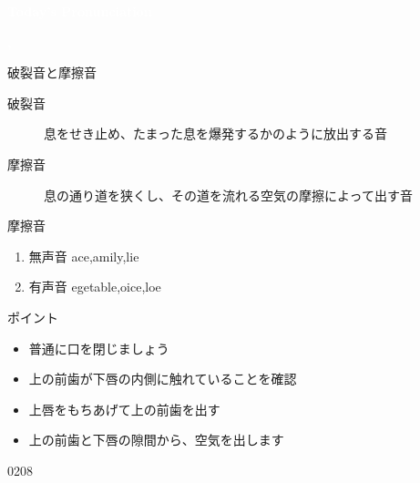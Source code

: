 \documentclass[aspectratio=169,xcolor={dvipsnames,table}]{beamer}
\begin{document}
\begin{frame}
\centering
  \textcolor{white}{\Huge\bfseries Today's Pronunciation}\pause

 \vspace{30pt}

  \textcolor{white}{\Huge\bfseries {}, }

\end{frame}
\begin{frame}[plain]{破裂音と摩擦音}
\large

 \begin{description}
  \item[破裂音] 息をせき止め、たまった息を爆発するかのように放出する音\\
\hspace{10pt}  \hspace{10pt} 
  \item[摩擦音] 息の通り道を狭くし、その道を流れる空気の摩擦によって出す音
 \end{description}
\end{frame}
 \begin{frame}[plain,label=slide_f_v]{摩擦音}

\large

\begin{enumerate}
 \item  無声音 \hspace{22pt}ace,\hspace{1\zw}amily,\hspace{1\zw}lie
 \item  有声音 \hspace{20pt}egetable,\hspace{1\zw}oice,\hspace{1\zw}loe
\end{enumerate}


\vspace*{20pt}

\normalsize
ポイント

\begin{itemize}[circle]
 \item 普通に口を閉じましょう
 \item 上の前歯が下唇の内側に触れていることを確認
 \item 上唇をもちあげて上の前歯を出す
 \item 上の前歯と下唇の隙間から、空気を出します
\end{itemize}

\hfill{\tiny 0208}\,{\scriptsize {}}
\end{frame}
\end{document}

